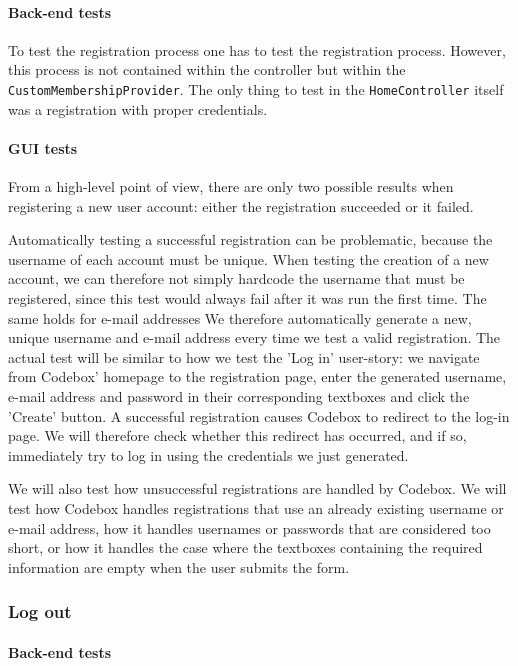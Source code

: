 \documentclass[10pt,a4paper,BCOR12mm, headexclude, footexclude,
  twoside, openright]{scrartcl}
\numberwithin{equation}{section} %
\numberwithin{figure}{section} %
\numberwithin{table}{section} %
\begin{document}
\paragraph{Back-end tests}
To test the registration process one has to test the registration process.
However, this process is not contained within the controller but within the \texttt{Custom\-Member\-ship\-Provider}.
The only thing to test in the \texttt{HomeController} itself was a registration with proper credentials.

\paragraph{GUI tests}
From a high-level point of view, there are only two possible results when registering a new user account: either the registration succeeded or it failed.

Automatically testing a successful registration can be problematic, because the username of each account must be unique.
When testing the creation of a new account, we can therefore not simply hardcode the username that must be registered, since this test would always fail after it was run the first time.
The same holds for e-mail addresses
We therefore automatically generate a new, unique username and e-mail address every time we test a valid registration.
The actual test will be similar to how we test the 'Log in' user-story: we navigate from Codebox' homepage to the registration page, enter the generated username, e-mail address and password in their corresponding textboxes and click the 'Create' button.
A successful registration causes Codebox to redirect to the log-in page. We will therefore check whether this redirect has occurred, and if so, immediately try to log in using the credentials we just generated.

We will also test how unsuccessful registrations are handled by Codebox. We will test how Codebox handles registrations that use an already existing username or e-mail address, how it handles usernames or passwords that are considered too short, or how it handles the case where the textboxes containing the required information are empty when the user submits the form.

\subsubsection*{Log out}
\paragraph{Back-end tests}
\end{document}
